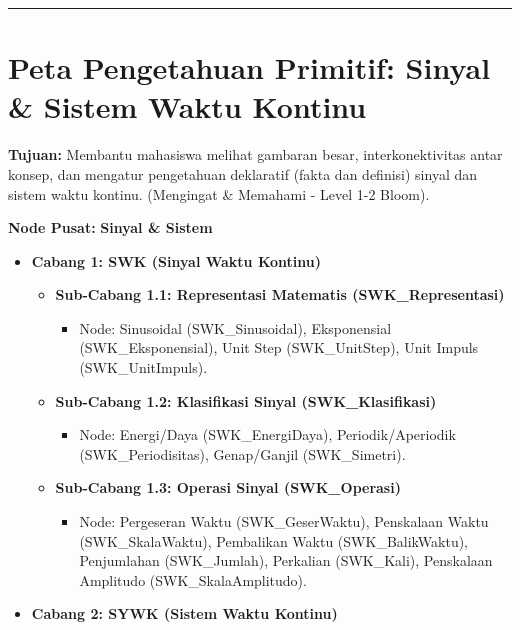 \documentclass[
  letterpaper,
  DIV=11,
  numbers=noendperiod]{scrreprt}
\providecommand{\tightlist}{%
  \setlength{\itemsep}{0pt}\setlength{\parskip}{0pt}}
\begin{document}
\begin{center}\rule{0.5\linewidth}{0.5pt}\end{center}

\section{Peta Pengetahuan Primitif: Sinyal \& Sistem Waktu
Kontinu}\label{peta-pengetahuan-primitif-sinyal-sistem-waktu-kontinu}

\textbf{Tujuan:} Membantu mahasiswa melihat gambaran besar,
interkonektivitas antar konsep, dan mengatur pengetahuan deklaratif
(fakta dan definisi) sinyal dan sistem waktu kontinu. (Mengingat \&
Memahami - Level 1-2 Bloom).

\textbf{Node Pusat:} \textbf{Sinyal \& Sistem}

\begin{itemize}
\item
  \textbf{Cabang 1: SWK (Sinyal Waktu Kontinu)}

  \begin{itemize}
  \tightlist
  \item
    \textbf{Sub-Cabang 1.1: Representasi Matematis (SWK\_Representasi)}

    \begin{itemize}
    \tightlist
    \item
      Node: Sinusoidal (SWK\_Sinusoidal), Eksponensial
      (SWK\_Eksponensial), Unit Step (SWK\_UnitStep), Unit Impuls
      (SWK\_UnitImpuls).
    \end{itemize}
  \item
    \textbf{Sub-Cabang 1.2: Klasifikasi Sinyal (SWK\_Klasifikasi)}

    \begin{itemize}
    \tightlist
    \item
      Node: Energi/Daya (SWK\_EnergiDaya), Periodik/Aperiodik
      (SWK\_Periodisitas), Genap/Ganjil (SWK\_Simetri).
    \end{itemize}
  \item
    \textbf{Sub-Cabang 1.3: Operasi Sinyal (SWK\_Operasi)}

    \begin{itemize}
    \tightlist
    \item
      Node: Pergeseran Waktu (SWK\_GeserWaktu), Penskalaan Waktu
      (SWK\_SkalaWaktu), Pembalikan Waktu (SWK\_BalikWaktu), Penjumlahan
      (SWK\_Jumlah), Perkalian (SWK\_Kali), Penskalaan Amplitudo
      (SWK\_SkalaAmplitudo).
    \end{itemize}
  \end{itemize}
\item
  \textbf{Cabang 2: SYWK (Sistem Waktu Kontinu)}


\end{itemize}
\end{document}
